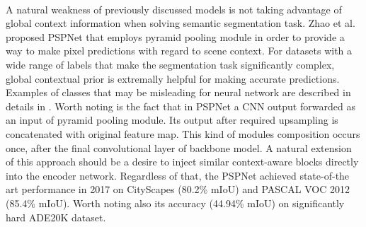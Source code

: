 \documentclass{article}
\begin{document}
\paragraph{}
A natural weakness of previously discussed models is not taking advantage of global context information when solving semantic segmentation task. Zhao et al. proposed PSPNet \cite{psp} that employs pyramid pooling module in order to provide a way to make pixel predictions with regard to scene context. For datasets with a wide range of labels that make the segmentation task significantly complex, global contextual prior is extremally helpful for making accurate predictions. Examples of classes that may be misleading for neural network are described in details in \cite{psp}. Worth noting is the fact that in PSPNet \cite{psp} a CNN output forwarded as an input of pyramid pooling module. Its output after required upsampling is concatenated with original feature map. This kind of modules composition occurs once, after the final convolutional layer of backbone model. A natural extension of this approach should be a desire to inject similar context-aware blocks directly into the encoder network. Regardless of that, the PSPNet \cite{psp} achieved state-of-the art performance in 2017 on CityScapes \cite{cityscapes} (80.2\% mIoU) and PASCAL VOC 2012 \cite{pascal_voc} (85.4\% mIoU). Worth noting also its accuracy (44.94\% mIoU) on significantly hard ADE20K \cite{ade20k} dataset.
\end{document}
